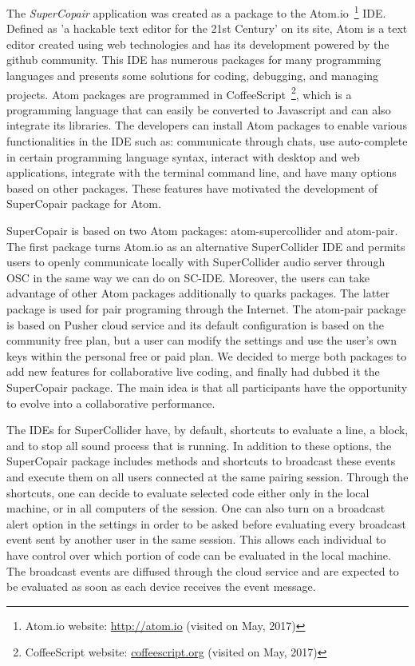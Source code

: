 The \textit{SuperCopair} application was created as a package to the Atom.io~\footnote{Atom.io website: \url{http://atom.io} (visited on May, 2017)} IDE.
Defined as 'a hackable text editor for the 21st Century' on its site, Atom is a text editor created using web technologies and has its development powered by the github community.
This IDE has numerous packages for many programming languages and presents some solutions for coding, debugging, and managing projects.
Atom packages are programmed in CoffeeScript~\footnote{CoffeeScript website: \url{coffeescript.org} (visited on May, 2017)}, which is a programming language that can easily be converted to Javascript and can also integrate its libraries.
The developers can install Atom packages to enable various functionalities in the IDE such as: communicate through chats, use auto-complete in certain programming language syntax, interact with desktop and web applications, integrate with the terminal command line, and have many options based on other packages.
These features have motivated the development of SuperCopair package for Atom.

SuperCopair is based on two Atom packages: atom-supercollider and atom-pair.
The first package turns Atom.io as an alternative SuperCollider IDE and permits users to openly communicate locally with SuperCollider audio server through OSC in the same way we can do on SC-IDE.
Moreover, the users can take advantage of other Atom packages additionally to quarks packages.
The latter package is used for pair programing through the Internet.
The atom-pair package is based on Pusher cloud service and its default configuration is based on the community free plan, but a user can modify the settings and use the user’s own keys within the personal free or paid plan. 
We decided to merge both packages to add new features for collaborative live coding, and finally had dubbed it the SuperCopair package.
The main idea is that all participants have the opportunity to evolve into a collaborative performance.

The IDEs for SuperCollider have, by default, shortcuts to evaluate a line, a block, and to stop all sound process that is running.
In addition to these options, the SuperCopair package includes methods and shortcuts to broadcast these events and execute them on all users connected at the same pairing session.
Through the shortcuts, one can decide to evaluate selected code either only in the local machine, or in all computers of the session.
One can also turn on a broadcast alert option in the settings in order to be asked before evaluating every broadcast event sent by another user in the same session. 
This allows each individual to have control over which portion of code can be evaluated in the local machine.
The broadcast events are diffused through the cloud service and are expected to be evaluated as soon as each device receives the event message.

